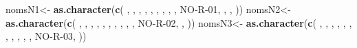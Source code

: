 \documentclass[
  openany]{book}
\newenvironment{Shaded}{\begin{snugshade}}{\end{snugshade}}
\newcommand{\FunctionTok}[1]{\textcolor[rgb]{0.13,0.29,0.53}{\textbf{#1}}}
\newcommand{\NormalTok}[1]{#1}
\newcommand{\OtherTok}[1]{\textcolor[rgb]{0.56,0.35,0.01}{#1}}
\newcommand{\StringTok}[1]{\textcolor[rgb]{0.31,0.60,0.02}{#1}}
\theoremstyle{definition}
\theoremstyle{definition}
\theoremstyle{definition}
\theoremstyle{definition}
\theoremstyle{remark}
\begin{document}
\begin{Shaded}
\begin{Highlighting}[]
\NormalTok{nomsN1}\OtherTok{\textless{}{-}} \FunctionTok{as.character}\NormalTok{(}\FunctionTok{c}\NormalTok{(}\StringTok{\textquotesingle{} \textquotesingle{}}\NormalTok{,   }\StringTok{\textquotesingle{} \textquotesingle{}}\NormalTok{,  }\StringTok{\textquotesingle{} \textquotesingle{}}\NormalTok{, }\StringTok{\textquotesingle{} \textquotesingle{}}\NormalTok{,   }\StringTok{\textquotesingle{} \textquotesingle{}}\NormalTok{,  }\StringTok{\textquotesingle{} \textquotesingle{}}\NormalTok{, }\StringTok{\textquotesingle{} \textquotesingle{}}\NormalTok{,   }\StringTok{\textquotesingle{} \textquotesingle{}}\NormalTok{,  }\StringTok{\textquotesingle{} \textquotesingle{}}\NormalTok{, }\StringTok{\textquotesingle{}NO{-}R{-}01\textquotesingle{}}\NormalTok{, }\StringTok{\textquotesingle{} \textquotesingle{}}\NormalTok{, }\StringTok{\textquotesingle{} \textquotesingle{}}\NormalTok{, }\StringTok{\textquotesingle{} \textquotesingle{}}\NormalTok{))}
\NormalTok{nomsN2}\OtherTok{\textless{}{-}} \FunctionTok{as.character}\NormalTok{(}\FunctionTok{c}\NormalTok{(}\StringTok{\textquotesingle{} \textquotesingle{}}\NormalTok{,   }\StringTok{\textquotesingle{} \textquotesingle{}}\NormalTok{,  }\StringTok{\textquotesingle{} \textquotesingle{}}\NormalTok{, }\StringTok{\textquotesingle{} \textquotesingle{}}\NormalTok{,   }\StringTok{\textquotesingle{} \textquotesingle{}}\NormalTok{,  }\StringTok{\textquotesingle{} \textquotesingle{}}\NormalTok{, }\StringTok{\textquotesingle{} \textquotesingle{}}\NormalTok{,   }\StringTok{\textquotesingle{} \textquotesingle{}}\NormalTok{,  }\StringTok{\textquotesingle{} \textquotesingle{}}\NormalTok{, }\StringTok{\textquotesingle{} \textquotesingle{}}\NormalTok{, }\StringTok{\textquotesingle{}NO{-}R{-}02\textquotesingle{}}\NormalTok{, }\StringTok{\textquotesingle{} \textquotesingle{}}\NormalTok{, }\StringTok{\textquotesingle{} \textquotesingle{}}\NormalTok{))}
\NormalTok{nomsN3}\OtherTok{\textless{}{-}} \FunctionTok{as.character}\NormalTok{(}\FunctionTok{c}\NormalTok{(}\StringTok{\textquotesingle{} \textquotesingle{}}\NormalTok{,   }\StringTok{\textquotesingle{} \textquotesingle{}}\NormalTok{,  }\StringTok{\textquotesingle{} \textquotesingle{}}\NormalTok{, }\StringTok{\textquotesingle{} \textquotesingle{}}\NormalTok{,   }\StringTok{\textquotesingle{} \textquotesingle{}}\NormalTok{,  }\StringTok{\textquotesingle{} \textquotesingle{}}\NormalTok{, }\StringTok{\textquotesingle{} \textquotesingle{}}\NormalTok{,   }\StringTok{\textquotesingle{} \textquotesingle{}}\NormalTok{,  }\StringTok{\textquotesingle{} \textquotesingle{}}\NormalTok{, }\StringTok{\textquotesingle{} \textquotesingle{}}\NormalTok{, }\StringTok{\textquotesingle{} \textquotesingle{}}\NormalTok{, }\StringTok{\textquotesingle{}NO{-}R{-}03\textquotesingle{}}\NormalTok{, }\StringTok{\textquotesingle{} \textquotesingle{}}\NormalTok{))}

\end{Highlighting}
\end{Shaded}
\end{document}
